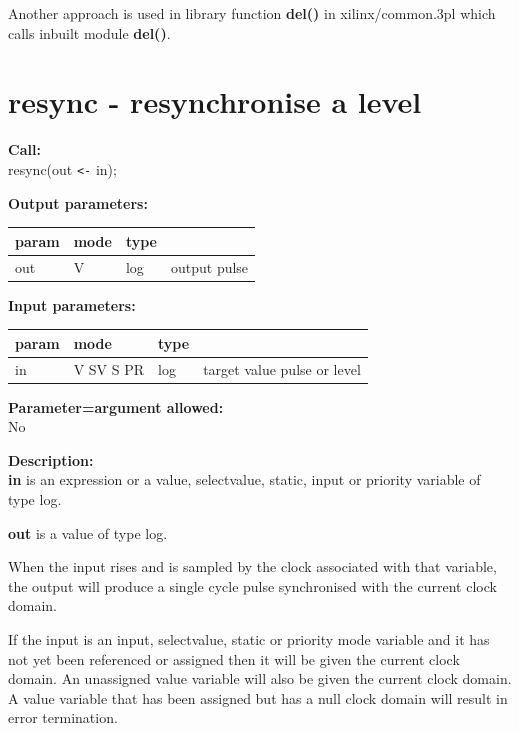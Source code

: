         Another approach is used in library function {\bf del()} in
        xilinx/common.3pl  which calls inbuilt module
        {\bf del()}.
        


       


    \section{resync - resynchronise a level}\label{sec:imresync}
        
        {\bf Call:} \\
        resync(out \verb'<-' in);
        
        {\bf Output parameters:} \\
        \begin{tabular}{| l | l | l | l |}
        \hline
        param & mode & type & \\
        \hline \hline
        out & V & log & output pulse \\ \hline
        \end{tabular}
        
        {\bf Input parameters:} \\
        \begin{tabular}{| l | l | l | l |}
        \hline
        param & mode & type & \\
        \hline \hline
        in    & V SV S PR & log & target value pulse or level \\ \hline
        \end{tabular}
        
        {\bf Parameter=argument allowed:} \\
        No
        
        {\bf Description:} \\
        {\bf in} is an expression or a value, selectvalue, static, input or
        priority variable of type log.
        
        {\bf out} is a value of type log.

        When the input rises and is sampled by the clock associated
        with that variable, the output will produce a single cycle pulse
        synchronised with the current clock domain.

        If the input is an input, selectvalue, static or priority mode variable
        and it has not yet been referenced or assigned then it will be
        given the current clock domain. An unassigned value variable
        will also be given the current clock domain. A value variable that
        has been assigned but has a null clock domain will result in error
        termination.

